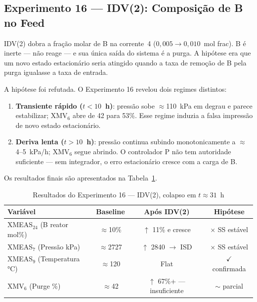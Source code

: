 \subsection{Experimento 16 — IDV(2): Composição de B no Feed}
\label{sec:exp16}

IDV(2) dobra a fração molar de B na corrente~4 ($0{,}005 \to 0{,}010$~mol frac). B é inerte — não reage — e sua única saída do sistema é a purga. A hipótese era que um novo estado estacionário seria atingido quando a taxa de remoção de B pela purga igualasse a taxa de entrada.

A hipótese foi refutada. O Experimento 16 revelou dois regimes distintos:

\begin{enumerate}
  \item \textbf{Transiente rápido ($t < 10$~h)}: pressão sobe $\approx$110~kPa em degrau e parece estabilizar; XMV$_6$ abre de 42 para 53\%. Esse regime induzia a falsa impressão de novo estado estacionário.
  \item \textbf{Deriva lenta ($t > 10$~h)}: pressão continua subindo monotonicamente a $\approx$4–5~kPa/h; XMV$_6$ segue abrindo. O controlador P não tem autoridade suficiente — sem integrador, o erro estacionário cresce com a carga de B.
\end{enumerate}

Os resultados finais são apresentados na Tabela~\ref{tab:exp16}.

\begin{table}[ht!]
\centering
\caption{Resultados do Experimento 16 — IDV(2), colapso em $t \approx 31$~h}
\label{tab:exp16}
\begin{tabular}{|l|c|c|c|}
\hline
\textbf{Variável}              & \textbf{Baseline} & \textbf{Após IDV(2)} & \textbf{Hipótese} \\
\hline
XMEAS$_{24}$ (B reator mol\%)  & $\approx$10\%     & $\uparrow$ 11\% e cresce & $\times$ SS estável \\
XMEAS$_7$ (Pressão kPa)        & $\approx$2727     & $\uparrow$ 2840 $\to$ ISD & $\times$ SS estável \\
XMEAS$_9$ (Temperatura °C)     & $\approx$120      & Flat                     & $\checkmark$ confirmada \\
XMV$_6$ (Purge \%)             & $\approx$42       & $\uparrow$ 67\%+ — insuficiente & $\sim$ parcial \\
\hline
\end{tabular}
\end{table}

